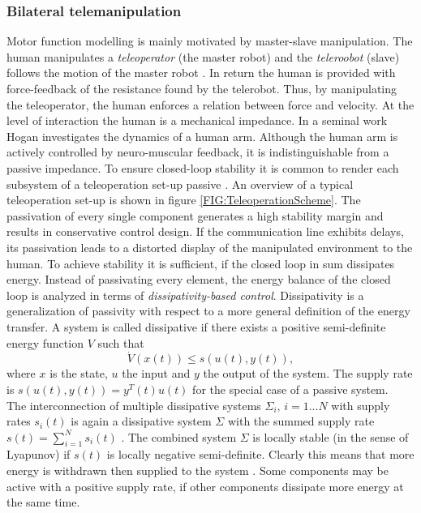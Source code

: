 \documentclass[a4paper,twoside, openright,12pt]{report}
\begin{document}
\subsubsection{Bilateral telemanipulation}\label{SS:BilateralTelemanipulation}
Motor function modelling is mainly motivated by master-slave manipulation. The human manipulates a \emph{teleoperator} (the master robot) and the \emph{teleroobot} (slave) follows the motion of the master robot \cite{TeleoperationHandbook}. In return the human is provided with force-feedback of the resistance found by the telerobot. Thus, by manipulating the teleoperator, the human enforces a relation between force and velocity. At the level of interaction the human is a mechanical impedance. In a seminal work Hogan \cite{Hogan1989} investigates the dynamics of a human arm. Although the human arm is actively controlled by neuro-muscular feedback, it is indistinguishable from a passive impedance. To ensure closed-loop stability it is common to render each subsystem of a teleoperation set-up passive \cite{Niemeyer2004}. An overview of a typical teleoperation set-up is shown in figure \ref{FIG:TeleoperationScheme}. The passivation of every single component generates a high stability margin and results in conservative control design. If the communication line exhibits delays, its passivation leads to a distorted display of the manipulated environment to the human. To achieve stability it is sufficient, if the closed loop in sum dissipates energy. Instead of passivating every element, the energy balance of the closed loop is analyzed in terms of \emph{dissipativity-based control}. Dissipativity is a generalization of passivity with respect to a more general definition of the energy transfer. A system is called dissipative if there exists a positive semi-definite energy function $V$ such that
\begin{equation}
\dot{V}(x(t)) \leq s(u(t),y(t)),
\end{equation}
where $x$ is the state, $u$ the input and $y$ the output of the system. The supply rate is $s(u(t),y(t)) = y^T(t)u(t)$ for the special case of a passive system.\\
The interconnection of multiple dissipative systems $\Sigma_i, \, i=1...N$ with supply rates $s_i(t)$ is again a dissipative system $\Sigma$ with the summed supply rate $s(t)=\sum_{i=1}^N s_i(t)$ .
The combined system $\Sigma$ is locally stable (in the sense of Lyapunov) if $s(t)$ is locally negative semi-definite. Clearly this means that more energy is withdrawn then supplied to the system \cite{Varnell2013}. Some components may be active with a positive supply rate, if other components dissipate more energy at the same time.\\
\end{document}
